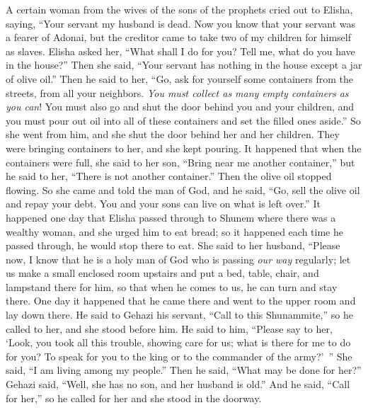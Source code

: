 \begin{biblechapter} %
 A certain woman from the wives of the sons of the prophets cried out to Elisha, saying, “Your servant my husband is dead. Now you know that your servant was a fearer of Adonai, but the creditor came to take two of my children for himself as slaves.
\verse Elisha asked her, “What shall I do for you? Tell me, what do you have in the house?” Then she said, “Your servant has nothing in the house except a jar of olive oil.”
\verse Then he said to her, “Go, ask for yourself some containers from the streets, from all your neighbors. \textit{You must collect as many empty containers as you can}!
\verse You must also go and shut the door behind you and your children, and you must pour out oil into all of these containers and set the filled ones aside.”
\verse So she went from him, and she shut the door behind her and her children. They were bringing containers to her, and she kept pouring.
\verse It happened that when the containers were full, she said to her son, “Bring near me another container,” but he said to her, “There is not another container.” Then the olive oil stopped flowing.
\verse So she came and told the man of God, and he said, “Go, sell the olive oil and repay your debt. You and your sons can live on what is left over.”
 It happened one day that Elisha passed through to Shunem where there was a wealthy woman, and she urged him to eat bread; so it happened each time he passed through, he would stop there to eat.
\verse She said to her husband, “Please now, I know that he is a holy man of God who is passing \textit{our way} regularly;
\verse let us make a small enclosed room upstairs and put a bed, table, chair, and lampstand there for him, so that when he comes to us, he can turn and stay there.
\verse One day it happened that he came there and went to the upper room and lay down there.
\verse He said to Gehazi his servant, “Call to this Shunammite,” so he called to her, and she stood before him.
\verse He said to him, “Please say to her, ‘Look, you took all this trouble, showing care for us; what is there for me to do for you? To speak for you to the king or to the commander of the army?’ ” She said, “I am living among my people.”
\verse Then he said, “What may be done for her?” Gehazi said, “Well, she has no son, and her husband is old.”
\verse And he said, “Call for her,” so he called for her and she stood in the doorway.

\end{biblechapter}
